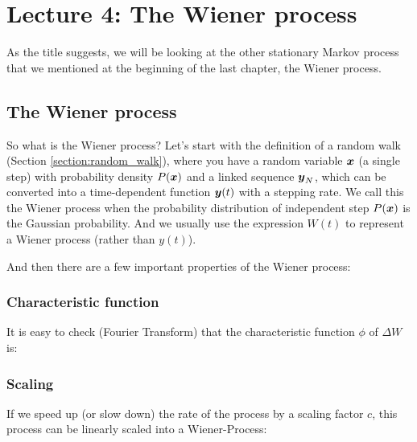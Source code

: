 \documentclass{report}
\begin{document}
\chapter{Lecture 4: The Wiener process}
As the title suggests, we will be looking at the other stationary Markov process that we mentioned at the beginning of the last chapter, the Wiener process.

\section{The Wiener process}
So what is the Wiener process? Let's start with the definition of a random walk (Section \ref{section:random_walk}), where you have a random variable $\boldsymbol{x}$ (a single step) with probability density $P(\boldsymbol{x})$ and a linked sequence $\boldsymbol{y}_N$, which can be converted into a time-dependent function $\boldsymbol{y}(t)$ with a stepping rate. We call this the Wiener process when the probability distribution of independent step $P(\boldsymbol{x})$ is the Gaussian probability. And we usually use the expression $W(t)$ to represent a Wiener process (rather than $y(t)$).

\noindent And then there are a few important properties of the Wiener process:
\subsection{Characteristic function}
It is easy to check (Fourier Transform) that the characteristic function $\phi$ of $\Delta W$ is:
\subsection{Scaling}
If we speed up (or slow down) the rate of the process by a scaling factor $c$, this process can be linearly scaled into a Wiener-Process:
\end{document}
